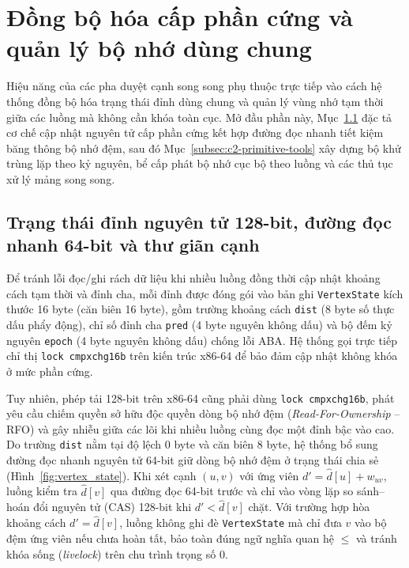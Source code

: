 \section{Đồng bộ hóa cấp phần cứng và quản lý bộ nhớ dùng chung}\label{sec:c2-primitives}

Hiệu năng của các pha duyệt cạnh song song phụ thuộc trực tiếp vào cách hệ thống đồng bộ hóa trạng thái đỉnh dùng chung và quản lý vùng nhớ tạm thời giữa các luồng mà không cần khóa toàn cục. Mở đầu phần này, Mục~\ref{subsec:c2-atomic-relax} đặc tả cơ chế cập nhật nguyên tử cấp phần cứng kết hợp đường đọc nhanh tiết kiệm băng thông bộ nhớ đệm, sau đó Mục~\ref{subsec:c2-primitive-tools} xây dựng bộ khử trùng lặp theo kỷ nguyên, bể cấp phát bộ nhớ cục bộ theo luồng và các thủ tục xử lý mảng song song.

\subsection{Trạng thái đỉnh nguyên tử 128-bit, đường đọc nhanh 64-bit và thư giãn cạnh}\label{subsec:c2-atomic-relax}

Để tránh lỗi đọc/ghi rách dữ liệu khi nhiều luồng đồng thời cập nhật khoảng cách tạm thời và đỉnh cha, mỗi đỉnh được đóng gói vào bản ghi \texttt{VertexState} kích thước 16 byte (căn biên 16 byte), gồm trường khoảng cách \texttt{dist} (8 byte số thực dấu phẩy động), chỉ số đỉnh cha \texttt{pred} (4 byte nguyên không dấu) và bộ đếm kỷ nguyên \texttt{epoch} (4 byte nguyên không dấu) chống lỗi ABA. Hệ thống gọi trực tiếp chỉ thị \texttt{lock cmpxchg16b} trên kiến trúc x86-64 để bảo đảm cập nhật không khóa ở mức phần cứng.

Tuy nhiên, phép tải 128-bit trên x86-64 cũng phải dùng \texttt{lock cmpxchg16b}, phát yêu cầu chiếm quyền sở hữu độc quyền dòng bộ nhớ đệm (\textit{Read-For-Ownership} -- RFO) và gây nhiễu giữa các lõi khi nhiều luồng cùng đọc một đỉnh bậc vào cao. Do trường \texttt{dist} nằm tại độ lệch 0 byte và căn biên 8 byte, hệ thống bổ sung đường đọc nhanh nguyên tử 64-bit giữ dòng bộ nhớ đệm ở trạng thái chia sẻ (Hình~\ref{fig:vertex_state}). Khi xét cạnh $(u, v)$ với ứng viên $d' = \widehat{d}[u] + w_{uv}$, luồng kiểm tra $\widehat{d}[v]$ qua đường đọc 64-bit trước và chỉ vào vòng lặp so sánh--hoán đổi nguyên tử (CAS) 128-bit khi $d' < \widehat{d}[v]$ chặt. Với trường hợp hòa khoảng cách $d' = \widehat{d}[v]$, luồng không ghi đè \texttt{VertexState} mà chỉ đưa $v$ vào bộ đệm ứng viên nếu chưa hoàn tất, bảo toàn đúng ngữ nghĩa quan hệ $\le$ và tránh khóa sống (\textit{livelock}) trên chu trình trọng số $0$.

